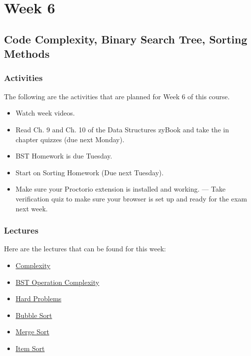 \clearpage

\chapter{Week 6}

\section{Code Complexity, Binary Search Tree, Sorting Methods}

\horizontalline

\subsection{Activities}

The following are the activities that are planned for Week 6 of this course.

\begin{itemize}
    \item Watch week videos.
    \item Read Ch. 9 and Ch. 10 of the Data Structures zyBook and take the in chapter quizzes (due next Monday).
    \item BST Homework is due Tuesday.
    \item Start on Sorting Homework (Due next Tuesday).
    \item Make sure your Proctorio extension is installed and working. --- Take verification quiz to make sure your browser is set up and ready for the exam next week.
\end{itemize}

\subsection{Lectures}

Here are the lectures that can be found for this week:

\begin{itemize}
    \item \href{https://applied.cs.colorado.edu/mod/hvp/view.php?id=45942}{Complexity}
    \item \href{https://applied.cs.colorado.edu/mod/hvp/view.php?id=45943}{BST Operation Complexity}
    \item \href{https://applied.cs.colorado.edu/mod/hvp/view.php?id=45944}{Hard Problems}
    \item \href{https://applied.cs.colorado.edu/mod/hvp/view.php?id=45945}{Bubble Sort}
    \item \href{https://applied.cs.colorado.edu/mod/hvp/view.php?id=45946}{Merge Sort}
    \item \href{https://applied.cs.colorado.edu/mod/hvp/view.php?id=45947}{Item Sort}
\end{itemize}

